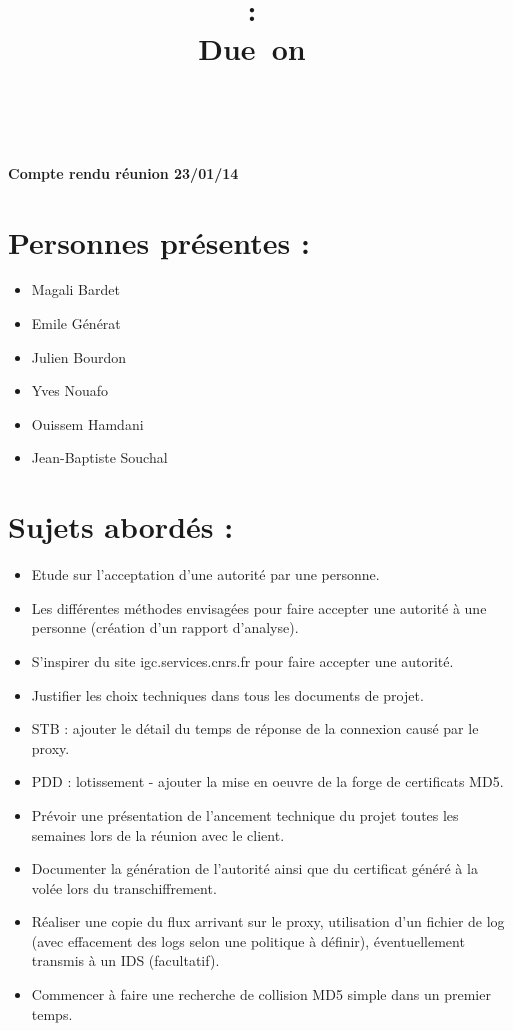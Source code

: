 \documentclass[a4paper,11pt,french]{article}
\title{
\vspace{2in}
\textmd{\textbf{\hmwkClass :\ \hmwkTitle}}\\
\normalsize\vspace{0.1in}\small{Due\ on\ \hmwkDueDate}\\
\vspace{0.1in}\large{\textit{\hmwkClassInstructor\ \hmwkClassTime}}
\vspace{3in}
}
\author{\hmwkAuthorName}
\date{} %
\newcommand{\hmwkDocName}{Compte rendu réunion 23/01/14} %
\begin{document}
\newcount\startdate
\newcount\daynum
\pagestyle{fancy}

\vspace*{5cm}
\begin{center}\textbf{\Huge{\hmwkDocName}}\end{center}
\vspace*{4.5cm}

\newpage




\section{Personnes présentes :}
\begin{itemize}
  \item Magali Bardet
  \item Emile Générat
  \item Julien Bourdon
  \item Yves Nouafo
  \item Ouissem Hamdani
  \item Jean-Baptiste Souchal
\end{itemize}

\section{Sujets abordés :}
\begin{itemize}
  \item Etude sur l'acceptation d'une autorité par une personne.
  \item Les différentes méthodes envisagées pour faire accepter une autorité à 
  une personne (création d'un rapport d'analyse).
  \item S'inspirer du site igc.services.cnrs.fr pour faire accepter une 
  autorité.
  \item Justifier les choix techniques dans tous les documents de projet.
  \item STB : ajouter le détail du temps de réponse de la connexion causé par le proxy.
  \item PDD : lotissement - ajouter la mise en oeuvre de la forge de certificats MD5.
  \item Prévoir une présentation de l'ancement technique du projet toutes les semaines lors de la réunion avec le client.
  \item Documenter la génération de l'autorité ainsi que du certificat généré à la volée lors du transchiffrement.
  \item Réaliser une copie du flux arrivant sur le proxy, utilisation d'un fichier de log (avec effacement des logs selon une politique à définir), éventuellement transmis à un IDS (facultatif).
  \item Commencer à faire une recherche de collision MD5 simple dans un premier temps.
\end{itemize}
\end{document}
